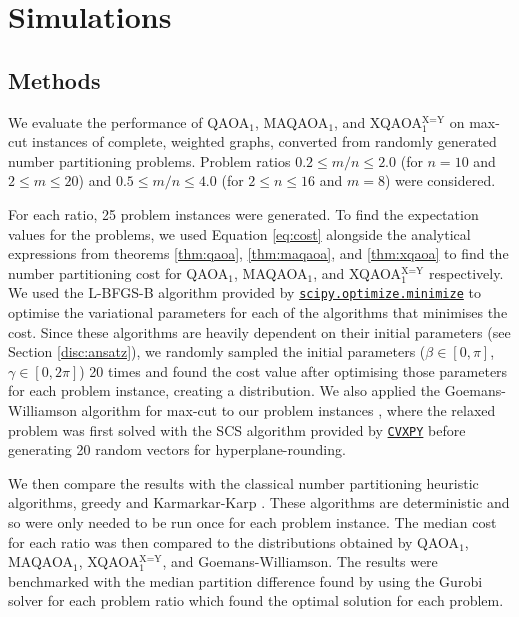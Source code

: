 \section{Simulations} \label{sec:sim}
\subsection{Methods}
We evaluate the performance of QAOA$_1$, MAQAOA$_1$, and XQAOA$_1^{\text{X=Y}}$ on max-cut instances of complete, weighted graphs, converted from randomly generated number partitioning problems. Problem ratios $0.2\leq m/n\leq 2.0$ (for $n=10$ and $2\leq m\leq 20$) and $0.5\leq m/n\leq 4.0$ (for $2\leq n\leq 16$ and $m=8$) were considered. 

For each ratio, 25 problem instances were generated. To find the expectation values for the problems, we used Equation \ref{eq:cost} alongside the analytical expressions from theorems \ref{thm:qaoa}, \ref{thm:maqaoa}, and \ref{thm:xqaoa} to find the number partitioning cost for QAOA$_1$, MAQAOA$_1$, and XQAOA$_1^{\text{X=Y}}$ respectively. We used the L-BFGS-B algorithm provided by \href{https://docs.scipy.org/doc/scipy/reference/optimize.minimize-lbfgsb.html}{\texttt{scipy.optimize.minimize}} to optimise the variational parameters for each of the algorithms that minimises the cost. Since these algorithms are heavily dependent on their initial parameters (see Section \ref{disc:ansatz}), we randomly sampled the initial parameters ($\beta\in[0,\pi]$, $\gamma\in[0,2\pi]$) 20 times and found the cost value after optimising those parameters for each problem instance, creating a distribution. We also applied the Goemans-Williamson algorithm for max-cut to our problem instances \cite{goemans1994879}, where the relaxed problem was first solved with the SCS algorithm provided by \href{https://www.cvxpy.org/tutorial/advanced/index.html}{\texttt{CVXPY}} before generating 20 random vectors for hyperplane-rounding.

We then compare the results with the classical number partitioning heuristic algorithms, greedy and Karmarkar-Karp \cite{korf2009multi}. These algorithms are deterministic and so were only needed to be run once for each problem instance. The median cost for each ratio was then compared to the distributions obtained by QAOA$_1$, MAQAOA$_1$, XQAOA$_1^{\text{X=Y}}$, and Goemans-Williamson. The results were benchmarked with the median partition difference found by using the Gurobi solver \cite{gurobi} for each problem ratio which found the optimal solution for each problem.




